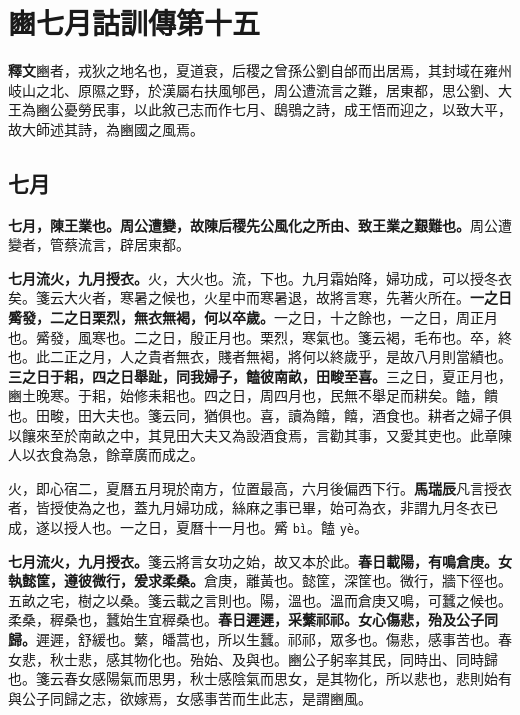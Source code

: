\chapter{豳七月詁訓傳第十五}

\begin{quoting}\textbf{釋文}豳者，戎狄之地名也，夏道衰，后稷之曾孫公劉自邰而出居焉，其封域在雍州岐山之北、原隰之野，於漢屬右扶風郇邑，周公遭流言之難，居東都，思公劉、大王為豳公憂勞民事，以此敘己志而作七月、鴟鴞之詩，成王悟而迎之，以致大平，故大師述其詩，為豳國之風焉。\end{quoting}

\section{七月}


\textbf{七月，陳王業也。周公遭變，故陳后稷先公風化之所由、致王業之艱難也。}{\footnotesize 周公遭變者，管蔡流言，辟居東都。}

\textbf{七月流火，九月授衣。}{\footnotesize 火，大火也。流，下也。九月霜始降，婦功成，可以授冬衣矣。箋云大火者，寒暑之候也，火星中而寒暑退，故將言寒，先著火所在。}\textbf{一之日觱發，二之日栗烈，無衣無褐，何以卒歲。}{\footnotesize 一之日，十之餘也，一之日，周正月也。觱發，風寒也。二之日，殷正月也。栗烈，寒氣也。箋云褐，毛布也。卒，終也。此二正之月，人之貴者無衣，賤者無褐，將何以終歲乎，是故八月則當績也。}\textbf{三之日于耜，四之日舉趾，同我婦子，饁彼南畝，田畯至喜。}{\footnotesize 三之日，夏正月也，豳土晚寒。于耜，始修耒耜也。四之日，周四月也，民無不舉足而耕矣。饁，饋也。田畯，田大夫也。箋云同，猶俱也。喜，讀為饎，饎，酒食也。耕者之婦子俱以饟來至於南畝之中，其見田大夫又為設酒食焉，言勸其事，又愛其吏也。此章陳人以衣食為急，餘章廣而成之。}

\begin{quoting}火，即心宿二，夏曆五月現於南方，位置最高，六月後偏西下行。\textbf{馬瑞辰}凡言授衣者，皆授使為之也，蓋九月婦功成，絲麻之事已畢，始可為衣，非謂九月冬衣已成，遂以授人也。一之日，夏曆十一月也。觱 \texttt{bì}。饁 \texttt{yè}。\end{quoting}

\textbf{七月流火，九月授衣。}{\footnotesize 箋云將言女功之始，故又本於此。}\textbf{春日載陽，有鳴倉庚。女執懿筐，遵彼微行，爰求柔桑。}{\footnotesize 倉庚，離黃也。懿筐，深筐也。微行，牆下徑也。五畝之宅，樹之以桑。箋云載之言則也。陽，溫也。溫而倉庚又鳴，可蠶之候也。柔桑，稺桑也，蠶始生宜稺桑也。}\textbf{春日遲遲，采蘩祁祁。女心傷悲，殆及公子同歸。}{\footnotesize 遲遲，舒緩也。蘩，皤蒿也，所以生蠶。祁祁，眾多也。傷悲，感事苦也。春女悲，秋士悲，感其物化也。殆始、及與也。豳公子躬率其民，同時出、同時歸也。箋云春女感陽氣而思男，秋士感陰氣而思女，是其物化，所以悲也，悲則始有與公子同歸之志，欲嫁焉，女感事苦而生此志，是謂豳風。}

